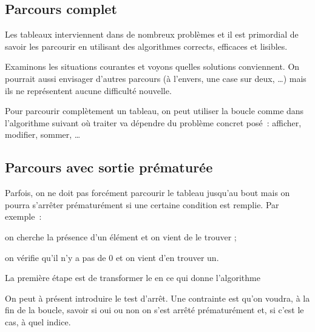 \subsection{Parcours complet}

Les tableaux interviennent dans de nombreux problèmes 
et il est primordial de savoir les parcourir 
en utilisant des algorithmes
corrects, efficaces et lisibles.

Examinons les situations courantes et voyons quelles solutions conviennent.
On pourrait aussi envisager d'autres parcours
(à l'envers, une case sur deux, \dots) 
mais ils ne représentent aucune difficulté nouvelle.

Pour parcourir complètement un tableau, 
on peut utiliser la boucle 
comme dans l'algorithme suivant
où \og{}traiter\fg{} va dépendre du problème concret posé~:
afficher, modifier, sommer, \dots


\subsection{Parcours avec sortie prématurée}

Parfois, on ne doit pas forcément parcourir le tableau jusqu'au bout
mais on pourra s'arrêter prématurément si une certaine condition est remplie.
Par exemple~:
\begin{liste}
\item on cherche la présence d'un élément et on vient de le trouver ;
\item on vérifie qu'il n'y a pas de $0$ et on vient d'en trouver un.
\end{liste}

La première étape est de transformer le  en 
ce qui donne l'algorithme 


On peut à présent introduire le test d'arrêt.
Une contrainte est qu'on voudra, à la fin de la boucle, savoir
si oui ou non on s'est arrêté prématurément et, si c'est le cas,
à quel indice.

